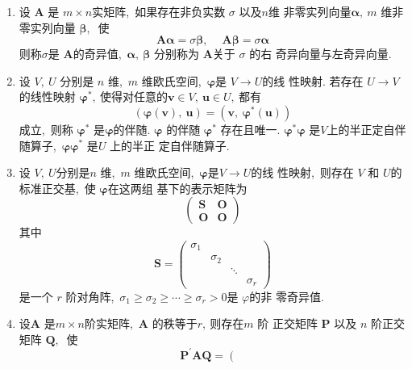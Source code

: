 \begin{enumerate}
		\item 设 $ \boldsymbol{A} $ 是 $ m \times n  $实矩阵,\  如果存在非负实数  $\sigma $ 以及$  n  $维 非零实列向量$  \boldsymbol{\alpha},\  m$  维非零实列向量  $\boldsymbol{\beta} ,\ $ 使
		$$\boldsymbol{A} \boldsymbol{\alpha}=\sigma \boldsymbol{\beta},\  \quad \boldsymbol{A} \boldsymbol{\beta}=\sigma \boldsymbol{\alpha}$$
		则称$  \sigma  $是  $\boldsymbol{A}  $的奇异值,\  $\boldsymbol{\alpha},\  \boldsymbol{\beta} $ 分别称为 $\boldsymbol{A}  $关于 $ \sigma$  的右 奇异向量与左奇异向量.
		\item 设 $ V,\  U$  分别是 $ n$  维,\ $  m $ 维欧氏空间,\  $\boldsymbol{\varphi} $是 $ V \rightarrow U  $的线 性映射. 若存在  $U \rightarrow V  $的线性映射  $\boldsymbol{\varphi} ^{*} ,\ $使得对任意的$ \boldsymbol{v} \in V,\  \boldsymbol{u} \in U ,\  $都有
		$$(\boldsymbol{\varphi}(\boldsymbol{v}),\  \boldsymbol{u})=\left(\boldsymbol{v},\  \boldsymbol{\varphi}^{*}(\boldsymbol{u})\right)$$
		成立,\  则称  $\boldsymbol{\varphi} ^{*} $ 是$ \boldsymbol{\varphi} $的伴随. $\boldsymbol{\varphi} $ 的伴随  $\boldsymbol{\varphi} ^{*} $ 存在且唯一. $ \boldsymbol{\varphi} ^{*} \boldsymbol{\varphi} $ 是$  V  $上的半正定自伴随算子,\   $\boldsymbol{\varphi} \boldsymbol{\varphi} ^{*} $ 是$  U $ 上的半正 定自伴随算子.
		\item 设 $ V,\  U  $分别是$ n$  维,\ $  m $ 维欧氏空间,\  $\boldsymbol{\varphi} $是$  V \rightarrow U  $的线 性映射,\  则存在  $V$  和  $U  $的标准正交基,\  使  $\boldsymbol{\varphi} $在这两组 基下的表示矩阵为
		$$\left(\begin{array}{ll}
			\boldsymbol{S} & \boldsymbol{O}  \\
			\boldsymbol{O}  & \boldsymbol{O} 
		\end{array}\right)$$
		其中
		$$\boldsymbol{S}=\left(\begin{array}{llll}
			\sigma_{1} & & & \\
			& \sigma_{2} & & \\
			& & \ddots & \\
			& & & \sigma_{r}
		\end{array}\right)$$
		是一个 $ r $ 阶对角阵,\   $\sigma_{1} \geqslant \sigma_{2} \geqslant \cdots \geqslant \sigma_{r}>0  $是  $\varphi  $的非 零奇异值.
		\item 设$  \boldsymbol{A}$  是$  m \times n  $阶实矩阵,\  $ \boldsymbol{A} $ 的秩等于$  r ,\  $则存在$  m $ 阶 正交矩阵  $\boldsymbol{P}$  以及 $ n $ 阶正交矩阵 $ \boldsymbol{Q} ,\ $ 使
		$$\boldsymbol{P}^{\prime}\boldsymbol{A} \boldsymbol{Q}=\left(\begin{array}{ll}

\end{array}$$
\end{enumerate}
